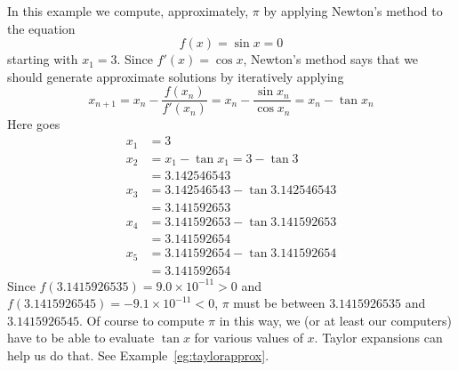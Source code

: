 \begin{eg}[Approximating $\pi$]\label{eg:exNTMpi}
In this example we compute, approximately, $\pi$ by
applying Newton's method to the equation
\begin{equation*}
f(x)=\sin x=0
\end{equation*}
starting with $x_1=3$. 
Since $f'(x)=\cos x$, Newton's method says that we should generate
approximate solutions by iteratively applying
\begin{equation*}
x_{n+1}=x_n-\frac{f(x_n)}{f'(x_n)}=x_n-\frac{\sin x_n}{\cos x_n}
=x_n-\tan x_n
\end{equation*}
Here goes
\begin{align*}
x_1&=3\\
x_2&=x_1-\tan x_1
=3-\tan 3\\
&=3.142546543\\
x_3&
=3.142546543-\tan 3.142546543\\
&=3.141592653\\
x_4&
=3.141592653-\tan 3.141592653\\
&=3.141592654\\
x_5&
=3.141592654-\tan 3.141592654\\
&=3.141592654
\end{align*}
Since  $f(3.1415926535)=9.0\times 10^{-11}>0$ and
$f(3.1415926545)=-9.1\times 10^{-11}<0$,
$\pi$ must be between $3.1415926535$ and $3.1415926545$.
Of course to compute $\pi$ in this way, we (or at least our computers) have to be able to evaluate $\tan x$ for various values of $x$. Taylor expansions can 
help us do that. See Example~\ref{eg:taylorapprox}.
\end{eg}


